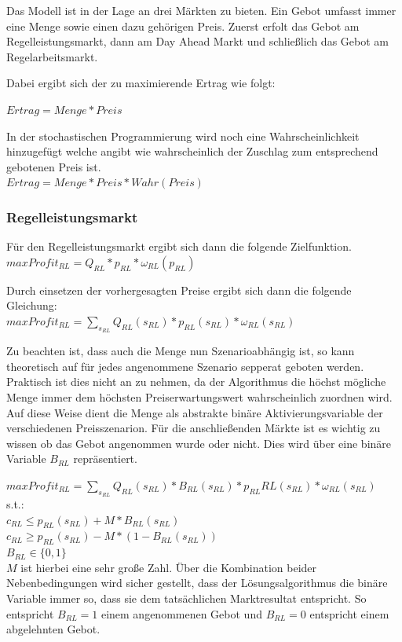\documentclass{article}
\begin{document}
Das Modell ist in der Lage an drei Märkten zu bieten. Ein Gebot umfasst immer eine Menge sowie einen dazu gehörigen Preis. Zuerst erfolt das Gebot am Regelleistungsmarkt, dann am Day Ahead Markt und schließlich das Gebot am Regelarbeitsmarkt.

Dabei ergibt sich der zu maximierende Ertrag wie folgt:

$Ertrag = Menge * Preis$

In der stochastischen Programmierung wird noch eine Wahrscheinlichkeit hinzugefügt welche angibt wie wahrscheinlich der Zuschlag zum entsprechend gebotenen Preis ist.\\

$Ertrag = Menge * Preis * Wahr(Preis)$
\subsubsection{Regelleistungsmarkt}
Für den Regelleistungsmarkt ergibt sich dann die folgende Zielfunktion.\\

$max Profit_{RL} = Q_{RL} * p_{RL} * \omega_{RL}(p_{RL})$

Durch einsetzen der vorhergesagten Preise ergibt sich dann die folgende Gleichung:\\

$max Profit_{RL} = \sum_{s_{RL}} Q_{RL}(s_{RL}) * p_{RL}(s_{RL}) * \omega_{RL}(s_{RL})$

Zu beachten ist, dass auch die Menge nun Szenarioabhängig ist, so kann theoretisch auf für jedes angenommene Szenario sepperat geboten werden. Praktisch ist dies nicht an zu nehmen, da der Algorithmus die höchst mögliche Menge immer dem höchsten Preiserwartungswert wahrscheinlich zuordnen wird. Auf diese Weise dient die Menge als abstrakte binäre Aktivierungsvariable der verschiedenen Preisszenarion.
Für die anschließenden Märkte ist es wichtig zu wissen ob das Gebot angenommen wurde oder nicht. Dies wird über eine binäre Variable $B_{RL}$ repräsentiert.

$max Profit_{RL} = \sum_{s_{RL}} Q_{RL}(s_{RL}) * B_{RL}(s_{RL}) * p_{RL}{RL}(s_{RL}) * \omega_{RL}(s_{RL})$\\
s.t.:\\
$c_{RL} \leq p_{RL}(s_{RL}) + M * B_{RL}(s_{RL}) $\\
$c_{RL} \geq p_{RL}(s_{RL}) - M * (1 - B_{RL}(s_{RL})) $\\
$B_{RL} \in \{0,1\}$\\
$M$ ist hierbei eine sehr große Zahl. Über die Kombination beider Nebenbedingungen wird sicher gestellt, dass der Lösungsalgorithmus die binäre Variable immer so, dass sie dem tatsächlichen Marktresultat entspricht. So entspricht $B_{RL} = 1$ einem angenommenen Gebot und $B_{RL} = 0$ entspricht einem abgelehnten Gebot.\\
\end{document}

